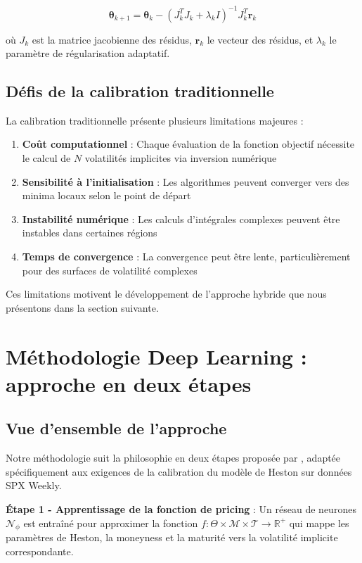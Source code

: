 \begin{equation}
\boldsymbol{\theta}_{k+1} = \boldsymbol{\theta}_k - (J_k^T J_k + \lambda_k I)^{-1} J_k^T \boldsymbol{r}_k
\end{equation}

où $J_k$ est la matrice jacobienne des résidus, $\boldsymbol{r}_k$ le vecteur des résidus, et $\lambda_k$ le paramètre de régularisation adaptatif.

\subsection{Défis de la calibration traditionnelle}

La calibration traditionnelle présente plusieurs limitations majeures :

\begin{enumerate}
\item \textbf{Coût computationnel} : Chaque évaluation de la fonction objectif nécessite le calcul de $N$ volatilités implicites via inversion numérique
\item \textbf{Sensibilité à l'initialisation} : Les algorithmes peuvent converger vers des minima locaux selon le point de départ
\item \textbf{Instabilité numérique} : Les calculs d'intégrales complexes peuvent être instables dans certaines régions
\item \textbf{Temps de convergence} : La convergence peut être lente, particulièrement pour des surfaces de volatilité complexes
\end{enumerate}

Ces limitations motivent le développement de l'approche hybride que nous présentons dans la section suivante.

\section{Méthodologie Deep Learning : approche en deux étapes}

\subsection{Vue d'ensemble de l'approche}

Notre méthodologie suit la philosophie en deux étapes proposée par \citet{bayer2018deep}, adaptée spécifiquement aux exigences de la calibration du modèle de Heston sur données SPX Weekly.

\textbf{Étape 1 - Apprentissage de la fonction de pricing} : Un réseau de neurones $\mathcal{N}_\phi$ est entraîné pour approximer la fonction $f : \Theta \times \mathcal{M} \times \mathcal{T} \rightarrow \mathbb{R}^+$ qui mappe les paramètres de Heston, la moneyness et la maturité vers la volatilité implicite correspondante.

